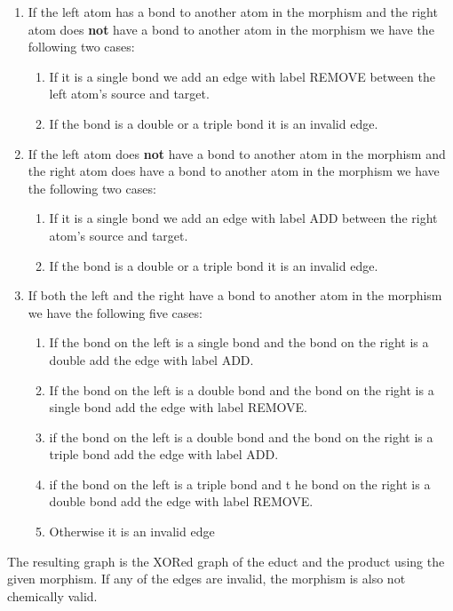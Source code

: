 \documentclass{article}
\begin{document}
\begin{enumerate}
    \item If the left atom has a bond to another atom in the morphism and the right atom does \textbf{not} have a bond to another atom in the morphism we have the following two cases:
    \begin{enumerate}
        \item If it is a single bond we add an edge with label REMOVE between the left atom's source and target.
        \item If the bond is a double or a triple bond it is an invalid edge.
    \end{enumerate}
    \item If the left atom does \textbf{not} have a bond to another atom in the morphism and the right atom does have a bond to another atom in the morphism we have the following two cases:
    \begin{enumerate}
        \item If it is a single bond we add an edge with label ADD between the right atom's source and target.
        \item If the bond is a double or a triple bond it is an invalid edge.
    \end{enumerate}
    \item If both the left and the right have a bond to another atom in the morphism we have the following five cases:
    \begin{enumerate}
        \item If the bond on the left is a single bond and the bond on the right is a double add the edge with label ADD.
        \item If the bond on the left is a double bond and the bond on the right is a single bond add the edge with label REMOVE.
        \item if the bond on the left is a double bond and the bond on the right is a triple bond add the edge with label ADD.
        \item if the bond on the left is a triple bond and t he bond on the right is a double bond add the edge with label REMOVE.
        \item Otherwise it is an invalid edge
    \end{enumerate}
\end{enumerate}
The resulting graph is the XORed graph of the educt and the product using the given morphism. If any of the edges are invalid, the morphism is also not chemically valid.
\end{document}
